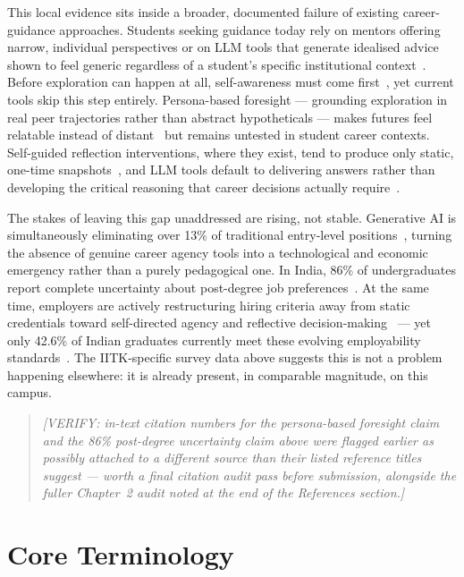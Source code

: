 This local evidence sits inside a broader, documented failure of existing career-guidance approaches. Students seeking guidance today rely on mentors offering narrow, individual perspectives or on LLM tools that generate idealised advice shown to feel generic regardless of a student's specific institutional context~\cite{simon2025}. Before exploration can happen at all, self-awareness must come first~\cite{lynn2023}, yet current tools skip this step entirely. Persona-based foresight --- grounding exploration in real peer trajectories rather than abstract hypotheticals --- makes futures feel relatable instead of distant~\cite{orf2023} but remains untested in student career contexts. Self-guided reflection interventions, where they exist, tend to produce only static, one-time snapshots~\cite{mercer2025}, and LLM tools default to delivering answers rather than developing the critical reasoning that career decisions actually require~\cite{gakujo2023}.

The stakes of leaving this gap unaddressed are rising, not stable. Generative AI is simultaneously eliminating over 13\% of traditional entry-level positions~\cite{simon2025}, turning the absence of genuine career agency tools into a technological and economic emergency rather than a purely pedagogical one. In India, 86\% of undergraduates report complete uncertainty about post-degree job preferences~\cite{cabinet2024}. At the same time, employers are actively restructuring hiring criteria away from static credentials toward self-directed agency and reflective decision-making~\cite{yatani2024} --- yet only 42.6\% of Indian graduates currently meet these evolving employability standards~\cite{jeon2025}. The IITK-specific survey data above suggests this is not a problem happening elsewhere: it is already present, in comparable magnitude, on this campus.

\begin{quotation}
\noindent\itshape\small
[VERIFY: in-text citation numbers for the persona-based foresight claim and the 86\% post-degree uncertainty claim above were flagged earlier as possibly attached to a different source than their listed reference titles suggest --- worth a final citation audit pass before submission, alongside the fuller Chapter~2 audit noted at the end of the References section.]
\end{quotation}

\section{Core Terminology}
\label{sec:core-terminology}

